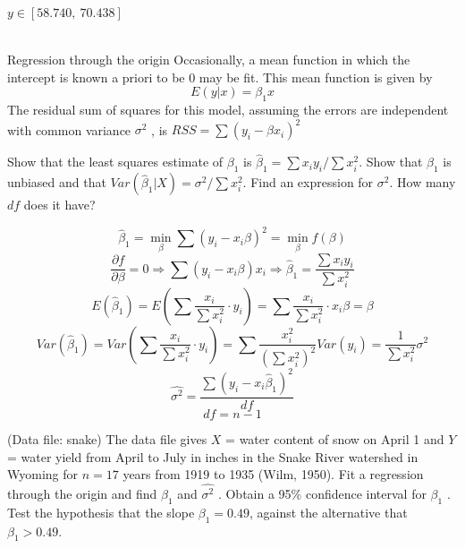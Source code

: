 \documentclass[12pt,oneside,a4paper]{article}\usepackage[]{graphicx}\usepackage[]{xcolor}
\newenvironment{problem}[2][Problem]{\begin{trivlist}
\item[\hskip \labelsep {\bfseries #1}\hskip \labelsep {\bfseries #2.}]}{\end{trivlist}}
\begin{document}
$y \in [58.740, ~70.438]$
\\\\
\begin{problem}{2.17}
Regression through the origin Occasionally, a mean function in which the intercept is known a priori to be 0 may be fit. This mean function is given by $$E(y|x) = \beta_{1}x$$
The residual sum of squares for this model, assuming the errors are independent with common variance $\sigma^{2}$ , is $RSS = \sum{(y_{i} - \beta x_{i})^2}$
\end{problem}

\begin{problem}{2.17.1}
Show that the least squares estimate of $\beta_{1}$ is $\hat{\beta}_{1} = \sum{x_{i}y_{i}} / \sum{x_{i}^{2}}$. Show that $\hat{\beta}_{1}$ is unbiased and that $Var(\hat{\beta}_{1}|X) = \sigma^{2} / \sum{x_{i}^2}$. Find an expression for $\sigma^{2}$. How many $df$ does it have?
\end{problem}

$$\hat{\beta}_{1} = \min_{\beta} \sum{(y_{i} - x_{i}\beta)^2} = \min_{\beta} f(\beta)$$
$$\frac{\partial f}{\partial \beta} = 0 \Rightarrow \sum{(y_{i} - x_{i}\beta)x_{i}} \Rightarrow \hat{\beta}_{1} = \frac{\sum{x_{i}y_{i}}}{\sum{x_{i}^{2}}}$$ 
$$E(\hat{\beta}_{1}) = E(\sum{\frac{x_{i}}{\sum{x_{i}^2}}\cdot y_{i}}) = \sum{\frac{x_{i}}{\sum{x_{i}^2}}\cdot x_{i}\beta} = \beta$$
$$Var(\hat{\beta}_{1}) = Var(\sum{\frac{x_{i}}{\sum{x_{i}^2}}\cdot y_{i}}) = \sum{\frac{x_{i}^2}{(\sum{x_{i}^2})^2}Var(y_{i})} = \frac{1}{\sum{x_{i}^2}}\sigma^2$$
$$\hat{\sigma^2} = \frac{\sum{(y_{i} - x_{i}\hat{\beta}_{1})^2}}{df}$$
$$df = n-1$$

\begin{problem}{2.17.2}
(Data file: snake) The data file gives $X$ = water content of snow on April 1 and $Y$ = water yield from April to July in inches in the Snake River watershed in Wyoming for $n = 17$ years from 1919 to 1935 (Wilm, 1950). Fit a regression through the origin and find $\hat{\beta}_{1}$ and $\hat{\sigma^2}$ . Obtain a 95\% confidence interval for $\beta_{1}$ . Test the hypothesis that the slope $\beta_{1} = 0.49$, against the alternative that $\beta_{1} > 0.49$.
\end{problem}
\end{document}
